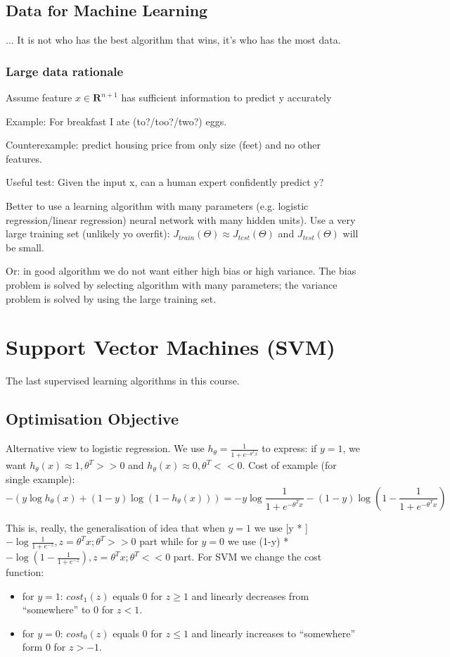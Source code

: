 \documentclass{scrartcl}
\begin{document}
\subsection{Data for Machine Learning}
\label{sec:11-5}

... It is not who has the best algorithm that wins, it's who has the
most data.

\subsubsection{Large data rationale}
\label{sec:11-5-1}

Assume feature $x \in \mathbf{R}^{n+1}$ has sufficient information to
predict y accurately

Example: For breakfast I ate (to?/too?/two?) eggs.

Counterexample: predict housing price from only size (feet) and no
other features.

Useful test: Given the input x, can a human expert confidently predict
y?

Better to use a learning algorithm with many parameters (e.g. logistic
regression/linear regression) neural network with many hidden units).
Use a very large training set (unlikely yo overfit):
$J_{train}(\Theta) \approx J_{test}(\Theta)$ and $J_{test}(\Theta)$
will be small.

Or: in good algorithm we do not want either high bias or high
variance. The bias problem is solved by selecting algorithm with many
parameters; the variance problem is solved by using the large training
set.


\section{Support Vector Machines (SVM)}
\label{sec:SVM}
The last supervised learning algorithms in this course.
\subsection{Optimisation Objective}
\label{sec:12-1}
Alternative view to logistic regression. We use $h_\theta = \frac{1}{1
  + e ^{-\theta^Tx}}$ to express: if $y=1$, we want $h_\theta(x)
\approx 1, \theta^{T} >> 0$ and $h_\theta(x) \approx 0, \theta^{T} <<
0$. Cost of example (for single example):
\[-(y \log h_\theta(x) + (1-y) \log(1-h_\theta(x))) = -y \log
\frac{1}{1 + e^{-\theta ^T x}} - (1-y) \log (1 - \frac{1}{1 +
  e^{-\theta^Tx}}) \]

This is, really, the generalisation of idea that when $y=1$ we use [y
* ]$-\log \frac{1}{1 + e^{-z}}, z = \theta^Tx; \theta^T >> 0$ part
while for $y=0$ we use (1-y) * $-\log (1 - \frac{1}{1 + e^{-z}}), z =
\theta^Tx; \theta^T << 0 $ part. For SVM we change the cost function:
\begin{itemize}
\item for $y = 1$: $cost_1(z)$ equals 0 for $z \geq 1$ and linearly
  decreases from ``somewhere'' to 0 for $z < 1$.
\item for $y = 0$: $cost_0(z)$ equals 0 for $z \leq 1$ and linearly
  increases to ``somewhere'' form 0 for $z > -1$.
\end{itemize}
\end{document}
